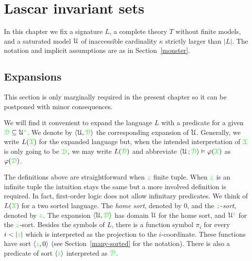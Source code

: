 \chapter{Lascar invariant sets}
\label{invariantL}

\def\medrel#1{\parbox[t]{6ex}{$\displaystyle\hfil #1$}}
\def\ceq#1#2#3{\parbox[t]{18ex}{$\displaystyle #1$}\medrel{#2}{$\displaystyle #3$}}

\def\mr{\color{brown}}
\def\gr{\color{green}}

In this chapter we fix a signature $L$, a complete theory $T$ without finite models, and a saturated model $\EuScript U$ of inaccessible cardinality $\kappa$ strictly larger than $|L|$.
The notation and implicit assumptions are as in Section~\ref{monster}.

\section{Expansions}
\label{expansions}

\def\ceq#1#2#3{\parbox[t]{16ex}{$\displaystyle #1$}\medrel{#2}{$\displaystyle #3$}}

This section is only marginally required in the present chapter so it can be postponed with minor consequences.

We will find it convenient to expand the language $L$ with a predicate for a given $\grD\subseteq\U^{\gr z}$.
We denote by $\<\U,\grD\>$ the corresponding expansion of $\EuScript U$.
Generally, we write \emph{$L({\gr\X})$} for the expanded language but, when the intended interpretation of ${\gr\X}$ is only going to be $\grD$, we may write \emph{$L(\grD)$} and abbreviate $\<\U\,;\grD\>\models\phi({\gr\X})$ as $\phi(\grD)$. 



\begin{remark}
The definitions above are straightforward when ${\gr z}$ finite tuple.
When ${\gr z}$ is an infinite tuple the intuition stays the same but a more involved definition is required.
In fact, first-order logic does not allow infinitary predicates.
We think of $L({\gr\X})$ for a two sorted language.
The \textit{home sort}, denoted by $0$, and the ${\gr z}$-\textit{sort}, denoted by ${\gr z}$.
The expansion $\<\U,\grD\>$ has domain $\EuScript U$ for the home sort, and $\U^{\gr z}$ for the ${\gr z}$-sort.
Besides the symbols of $L$, there is a function symbol $\pi_i$ for every $i<|{\gr z}|$ which is interpreted as the projection to the $i$-coordinate.
These functions have sort $\<{\gr z},0\>$ (see Section~\ref{many-sorted} for the notation).
There is also a predicate of sort $\<{\gr z}\>$ interpreted as $\grD$.
\end{remark}

